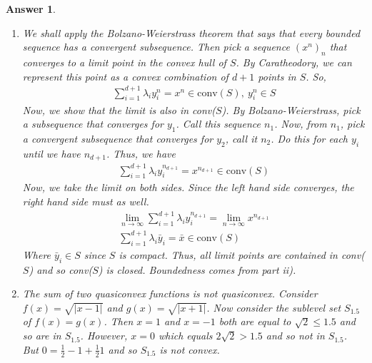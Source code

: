 \documentclass[12pt]{article}
\theoremstyle{colon}
\newtheorem*{answer}{Answer}
\begin{document}
\begin{answer}
\begin{enumerate}[label=\roman*)]
    \item We shall apply the Bolzano-Weierstrass theorem that says that every bounded sequence has a convergent subsequence. Then pick a sequence $(x^n)_n$ that converges to a limit point in the convex hull of $S$. By Caratheodory, we can represent this point as a convex combination of $d+1$ points in $S$. So,
      \begin{gather*}
        \sum_{i=1}^{d+1} \lambda_i y_i^n = x^n \in \text{conv}(S), \ y_i^n \in S
      \end{gather*}
      Now, we show that the limit is also in conv($S$). By Bolzano-Weierstrass, pick a subsequence that converges for $y_1$. Call this sequence $n_1$. Now, from $n_1$, pick a convergent subsequence that converges for $y_2$, call it $n_2$. Do this for each $y_i$ until we have $n_{d+1}$. Thus, we have
      \begin{gather*}
        \sum_{i=1}^{d+1} \lambda_i y_i^{n_{d+1}} = x^{n_{d+1}} \in \text{conv}(S)
      \end{gather*}
      Now, we take the limit on both sides. Since the left hand side converges, the right hand side must as well.
      \begin{gather*}
        \lim_{n \rightarrow \infty} \sum_{i=1}^{d+1} \lambda_i y_i^{n_{d+1}} = \lim_{n \rightarrow \infty} x^{n_{d+1}} \\
        \sum_{i=1}^{d+1} \lambda_i \bar{y}_i = \bar{x} \in \text{conv}(S)
      \end{gather*}
      Where $\bar{y}_i \in S$ since $S$ is compact. Thus, all limit points are contained in conv($S$) and so conv($S$) is closed. Boundedness comes from part ii).

    \item The sum of two quasiconvex functions is not quasiconvex. Consider $f(x) = \sqrt{\lvert x - 1 \rvert}$ and $g(x) = \sqrt{\lvert x + 1 \rvert}$. Now consider the sublevel set $S_{1.5}$ of $f(x) = g(x)$. Then $x = 1$ and $x = -1$ both are equal to $\sqrt{2} \leq 1.5$ and so are in $S_{1.5}$. However, $x = 0$ which equals $2 \sqrt{2}> 1.5$ and so not in $S_{1.5}$. But $0 = \frac{1}{2} -1 + \frac{1}{2} 1$ and so $S_{1.5}$ is not convex.


\end{enumerate}
\end{answer}
\end{document}
